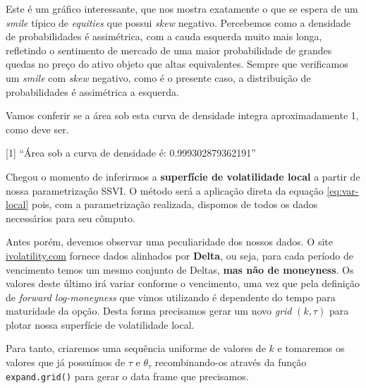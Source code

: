 \documentclass[]{book}
\newenvironment{Shaded}{\begin{snugshade}}{\end{snugshade}}
\newcommand{\KeywordTok}[1]{\textcolor[rgb]{0.13,0.29,0.53}{\textbf{#1}}}
\newcommand{\DataTypeTok}[1]{\textcolor[rgb]{0.13,0.29,0.53}{#1}}
\newcommand{\DecValTok}[1]{\textcolor[rgb]{0.00,0.00,0.81}{#1}}
\newcommand{\StringTok}[1]{\textcolor[rgb]{0.31,0.60,0.02}{#1}}
\newcommand{\ControlFlowTok}[1]{\textcolor[rgb]{0.13,0.29,0.53}{\textbf{#1}}}
\newcommand{\OperatorTok}[1]{\textcolor[rgb]{0.81,0.36,0.00}{\textbf{#1}}}
\newcommand{\NormalTok}[1]{#1}
\theoremstyle{definition}
\theoremstyle{definition}
\theoremstyle{definition}
\theoremstyle{remark}
\begin{document}
Este é um gráfico interessante, que nos mostra exatamente o que se
espera de um \emph{smile} típico de \emph{equities} que possui
\emph{skew} negativo. Percebemos como a densidade de probabilidades é
assimétrica, com a cauda esquerda muito mais longa, refletindo o
sentimento de mercado de uma maior probabilidade de grandes quedas no
preço do ativo objeto que altas equivalentes. Sempre que verificamos um
\emph{smile} com \emph{skew} negativo, como é o presente caso, a
distribuição de probabilidades é assimétrica a esquerda.

Vamos conferir se a área sob esta curva de densidade integra
aproximadamente 1, como deve ser.

\begin{Shaded}
\end{Shaded}

{[}1{]} ``Área sob a curva de densidade é: 0.999302879362191''

Chegou o momento de inferirmos a \textbf{superfície de volatilidade
local} a partir de nossa parametrização SSVI. O método será a aplicação
direta da equação \eqref{eq:var-local} pois, com a parametrização
realizada, dispomos de todos os dados necessários para seu cômputo.

Antes porém, devemos observar uma peculiaridade dos nossos dados. O site
\href{https://ivolatility.com}{ivolatility.com} fornece dados alinhados
por \textbf{Delta}, ou seja, para cada período de vencimento temos um
mesmo conjunto de Deltas, \textbf{mas não de moneyness}. Os valores
deste último irá variar conforme o vencimento, uma vez que pela
definição de \emph{forward log-moneyness} que vimos utilizando é
dependente do tempo para maturidade da opção. Desta forma precisamos
gerar um novo \emph{grid} \((k, \tau)\) para plotar nossa superfície de
volatilidade local.

Para tanto, criaremos uma sequência uniforme de valores de \(k\) e
tomaremos os valores que já possuímos de \(\tau\) e \(\theta_\tau\)
recombinando-os através da função \texttt{expand.grid()} para gerar o
data frame que precisamos.
\end{document}
